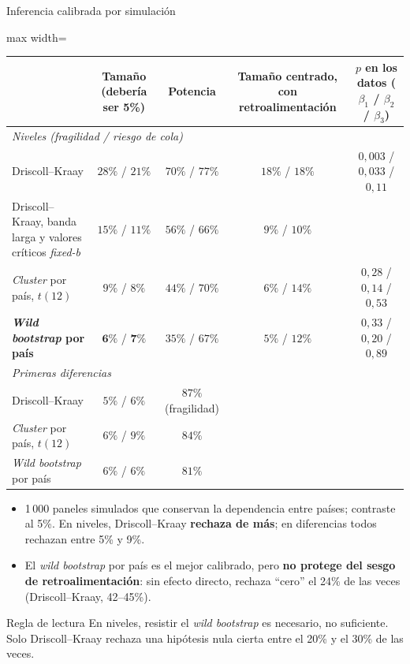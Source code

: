 \documentclass[aspectratio=169]{beamer}
\begin{document}
\begin{frame}{Inferencia calibrada por simulación}
\centering
\footnotesize
\begin{adjustbox}{max width=\textwidth}
\begin{tabular}{l ccc c}
\toprule
 & Tamaño (debería ser 5\%) & Potencia & Tamaño centrado, con retroalimentación & $p$ en los datos ($\beta_1$ / $\beta_2$ / $\beta_3$) \\
\midrule
\multicolumn{5}{l}{\textit{Niveles (fragilidad / riesgo de cola)}} \\
Driscoll--Kraay & $28\%$ / $21\%$ & $70\%$ / $77\%$ & $18\%$ / $18\%$ & $0{,}003$ / $0{,}033$ / $0{,}11$ \\
Driscoll--Kraay, banda larga y valores críticos \textit{fixed-b} & $15\%$ / $11\%$ & $56\%$ / $66\%$ & $9\%$ / $10\%$ & \\
\textit{Cluster} por país, $t(12)$ & $9\%$ / $8\%$ & $44\%$ / $70\%$ & $6\%$ / $14\%$ & $0{,}28$ / $0{,}14$ / $0{,}53$ \\
\textbf{\textit{Wild bootstrap} por país} & $\mathbf{6\%}$ / $\mathbf{7\%}$ & $35\%$ / $67\%$ & $5\%$ / $12\%$ & $0{,}33$ / $0{,}20$ / $0{,}89$ \\
\midrule
\multicolumn{5}{l}{\textit{Primeras diferencias}} \\
Driscoll--Kraay & $5\%$ / $6\%$ & $87\%$ (fragilidad) & & \\
\textit{Cluster} por país, $t(12)$ & $6\%$ / $9\%$ & $84\%$ & & \\
\textit{Wild bootstrap} por país & $6\%$ / $6\%$ & $81\%$ & & \\
\bottomrule
\end{tabular}
\end{adjustbox}
\vspace{2pt}
\begin{itemize}\footnotesize\setlength\itemsep{1pt}
\item 1\,000 paneles simulados que conservan la dependencia entre países; contraste al 5\%. En niveles, Driscoll--Kraay \textbf{rechaza de más}; en diferencias todos rechazan entre 5\% y 9\%.
\item El \textit{wild bootstrap} por país es el mejor calibrado, pero \textbf{no protege del sesgo de retroalimentación}: sin efecto directo, rechaza ``cero'' el 24\% de las veces (Driscoll--Kraay, 42--45\%).
\end{itemize}
\vspace{-6pt}
\begin{alertblock}{Regla de lectura}
\footnotesize En niveles, resistir el \textit{wild bootstrap} es necesario, no suficiente. Solo Driscoll--Kraay rechaza una hipótesis nula cierta entre el 20\% y el 30\% de las veces.
\end{alertblock}
\end{frame}
\end{document}
